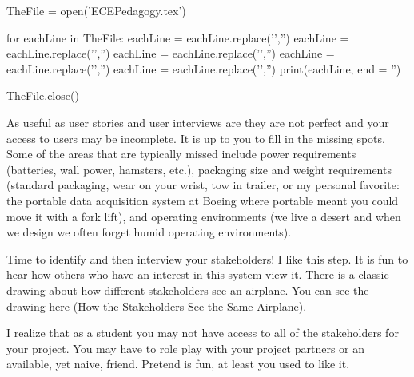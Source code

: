 \begin{itemize}
\begin{enumerate}
\begin{python}
TheFile = open('ECEPedagogy.tex')

for eachLine in TheFile:
    eachLine = eachLine.replace('','')
    eachLine = eachLine.replace('','')
    eachLine = eachLine.replace('','')
    eachLine = eachLine.replace('','')
    eachLine = eachLine.replace('','')
    print(eachLine, end = '')
		
TheFile.close()
\end{python}
\bigskip
		
	\end{enumerate}
\end{itemize}

\begin{slshape}
\color{blue}
As useful as user stories and user interviews are they are not perfect and your access to users may be incomplete.  It is up to you to fill in the missing spots.  Some of the areas that are typically missed include power requirements (batteries, wall power, hamsters, etc.), packaging size and weight requirements (standard packaging, wear on your wrist, tow in trailer, or my personal favorite: the portable data acquisition system at Boeing where portable meant you could move it with a fork lift), and operating environments (we live a desert and when we design we often forget humid operating environments).
\bigskip

\StopSign
Time to identify and then interview your stakeholders!  I like this step.  It is fun to hear how others who have an interest in this system view it.  There is a classic drawing about how different stakeholders see an airplane.  You can see the drawing here (\href{http://aviatormag.com.au/wp/intelligent-design/}{How the Stakeholders See the Same Airplane}). 
\bigskip

I realize that as a student you may not have access to all of the stakeholders for your project.  You may have to role play with your project partners or an available, yet naive, friend.  Pretend is fun, at least you used to like it.


\end{slshape}